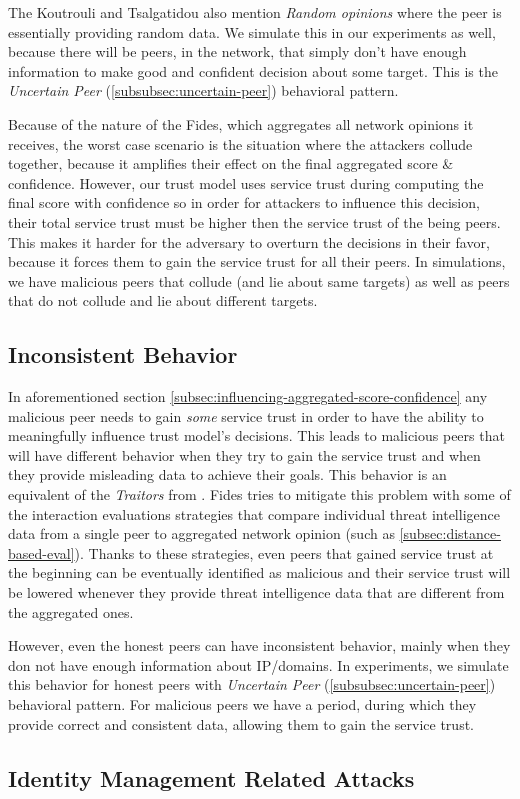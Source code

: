 The Koutrouli and Tsalgatidou \cite{KOUTROULI201247} also mention \textit{Random opinions} where the peer is essentially providing random data.
We simulate this in our experiments as well, because there will be peers, in the network, that simply don't have enough information to make good and confident decision about some target.
This is the \textit{Uncertain Peer} (\ref{subsubsec:uncertain-peer}) behavioral pattern.

Because of the nature of the Fides, which aggregates all network opinions it receives, the worst case scenario is the situation where the attackers collude together, because it amplifies their effect on the final aggregated score \& confidence.
However, our trust model uses service trust during computing the final score with confidence so in order for attackers to influence this decision, their total service trust must be higher then the service trust of the being peers.
This makes it harder for the adversary to overturn the decisions in their favor, because it forces them to gain the service trust for all their peers.
In simulations, we have malicious peers that collude (and lie about same targets) as well as peers that do not collude and lie about different targets.

\subsection{Inconsistent Behavior}
\label{subsec:inconsistent-behavior}
In aforementioned section \ref{subsec:influencing-aggregated-score-confidence} any malicious peer needs to gain \textit{some} service trust in order to have the ability to meaningfully influence trust model's decisions.
This leads to malicious peers that will have different behavior when they try to gain the service trust and when they provide misleading data to achieve their goals.
This behavior is an equivalent of the \textit{Traitors} from \cite{KOUTROULI201247}.
Fides tries to mitigate this problem with some of the interaction evaluations strategies that compare individual threat intelligence data from a single peer to aggregated network opinion (such as \ref{subsec:distance-based-eval}).
Thanks to these strategies, even peers that gained service trust at the beginning can be eventually identified as malicious and their service trust will be lowered whenever they provide threat intelligence data that are different from the aggregated ones.

However, even the honest peers can have inconsistent behavior, mainly when they don not have enough information about IP/domains.
In experiments, we simulate this behavior for honest peers with \textit{Uncertain Peer} (\ref{subsubsec:uncertain-peer}) behavioral pattern.
For malicious peers we have a period, during which they provide correct and consistent data, allowing them to gain the service trust. 

\subsection{Identity Management Related Attacks}
\label{subsec:identity-management-attacks}
